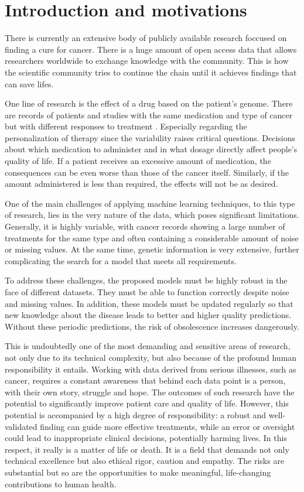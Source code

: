 \chapter{Introduction and motivations}\label{cap:introduccion}

There is currently an extensive body of publicly available research foccused on finding a cure for cancer. There is a huge amount of open access data \cite{tcga_nci, gdsc_website} that allows researchers worldwide to exchange knowledge with the community. This is how the scientific community tries to continue the chain until it achieves findings that can save lifes. 

One line of research is the effect of a drug based on the patient's genome. There are records of patients and studies with the same medication and type of cancer but with different responses to treatment \cite{genomicBiology, metastasisCancer}. Especially regarding the personalization of therapy since the variability raises critical questions. Decisions about which medication to administer and in what dosage directly affect people's quality of life. If a patient receives an excessive amount of medication, the consequences can be even worse than those of the cancer itself. Similarly, if the amount administered is less than required, the effects will not be as desired.

One of the main challenges of applying machine learning techniques, to this type of research, lies in the very nature of the data, which poses significant limitations. Generally, it is highly variable, with cancer records showing a large number of treatments for the same type and often containing a considerable amount of noise or missing values. At the same time, genetic information is very extensive, further complicating the search for a model that meets all requirements.

To address these challenges, the proposed models must be highly robust in the face of different datasets. They must be able to function correctly despite noise and missing values. In addition, these models must be updated regularly so that new knowledge about the disease leads to better and higher quality predictions. Without these periodic predictions, the risk of obsolescence increases dangerously.

This is undoubtedly one of the most demanding and sensitive areas of research, not only due to its technical complexity, but also because of the profound human responsibility it entails. Working with data derived from serious illnesses, such as cancer, requires a constant awareness that behind each data point is a person, with their own story, struggle and hope. The outcomes of such research have the potential to significantly improve patient care and quality of life. However, this potential is accompanied by a high degree of responsibility: a robust and well-validated finding can guide more effective treatments, while an error or oversight could lead to inappropriate clinical decisions, potentially harming lives. In this respect, it really is a matter of life or death. It is a field that demands not only technical excellence but also ethical rigor, caution and empathy. The risks are substantial but so are the opportunities to make meaningful, life-changing contributions to human health.